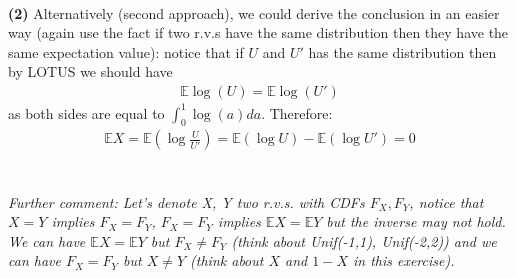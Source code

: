 \begin{exercise}[BH.5.16]
\begin{solution}
\begin{enumerate}
    	~\\
    	\textbf{(2)} Alternatively (second approach), we could derive the conclusion in an easier way (again use the fact if two r.v.s have the same distribution then they have the same expectation value):
    	notice that if $U$ and $U'$ has the same distribution then by LOTUS we should have 
    	\begin{align*}
    		\mathbb{E}\log(U)=	\mathbb{E}\log(U')
    	\end{align*}
    	as both sides are equal to $\int_{0}^1 \log(a)da$. Therefore:
    	\begin{align*}
    		\mathbb{E}X=\mathbb{E}\left( \log\frac{U}{U'} \right)	= \mathbb{E}\left( \log U \right)-\mathbb{E}\left( \log U'\right) =0
    	\end{align*}
    	~\\~\\\textit{Further comment: Let's denote X, Y two r.v.s. with CDFs $F_X, F_Y$, notice that $X=Y$ implies $F_X=F_Y$, $F_X=F_Y$ implies $\mathbb{E}X = \mathbb{E}Y$ but the inverse may not hold. We can have $\mathbb{E}X = \mathbb{E}Y$  but $F_X\neq F_Y$ (think about Unif(-1,1), Unif(-2,2)) and we can have $F_X = F_Y$ but $X\neq Y$ (think about $X$ and $1-X$ in this exercise).}
	\end{enumerate}
\end{solution}
\end{exercise}



